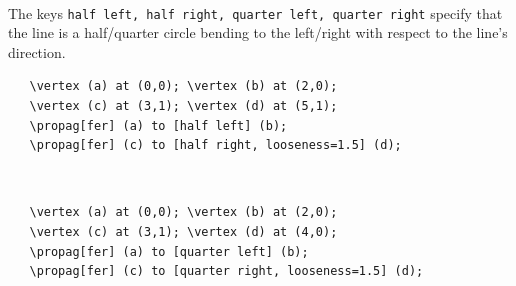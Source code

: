 \documentclass[10pt,letterpaper,twoside,notitlepage]{article}
\numberwithin{figure}{section}
\begin{document}
\\
The keys \vercol\verb$half left, half right, quarter left, quarter right$\txcol
specify that the line is a half/quarter circle bending to the left/right
with respect to the line's direction.
\vspace{2mm}\\
%
\begin{minipage}{0.7\linewidth}
\vercol\begin{verbatim}
   \vertex (a) at (0,0); \vertex (b) at (2,0);
   \vertex (c) at (3,1); \vertex (d) at (5,1);
   \propag[fer] (a) to [half left] (b);
   \propag[fer] (c) to [half right, looseness=1.5] (d);
\end{verbatim}\txcol
\end{minipage}
%
\begin{minipage}{0.25\linewidth}
\end{minipage}
\\
\begin{minipage}{0.7\linewidth}
\vercol\begin{verbatim}
   \vertex (a) at (0,0); \vertex (b) at (2,0);
   \vertex (c) at (3,1); \vertex (d) at (4,0);
   \propag[fer] (a) to [quarter left] (b);
   \propag[fer] (c) to [quarter right, looseness=1.5] (d);
\end{verbatim}\txcol
\end{minipage}
%
\begin{minipage}{0.25\linewidth}
\end{minipage}
%
\end{document}
